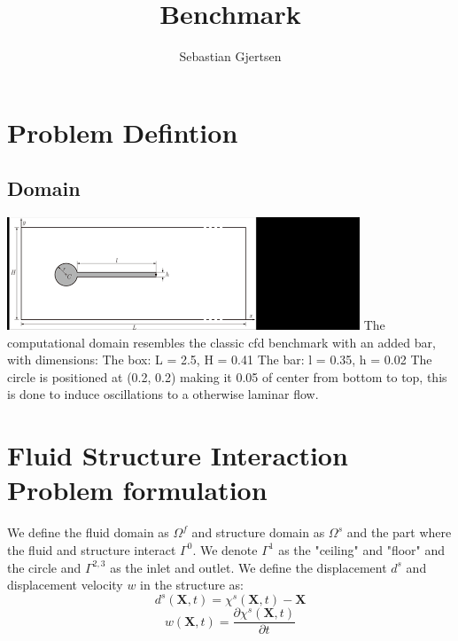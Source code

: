 
                                    
\title{Benchmark}
\author{Sebastian Gjertsen}

\maketitle
\section*{Problem Defintion}
\subsection*{Domain}
\includegraphics[scale=0.9]{geometry.png}
The computational domain resembles the classic cfd benchmark with an added bar, with dimensions:
The box: L = 2.5, H = 0.41
The bar: l = 0.35, h = 0.02
The circle is positioned at (0.2, 0.2) making it 0.05 of center from bottom to top, this is done to induce oscillations to a otherwise laminar flow.

\section*{Fluid Structure Interaction Problem formulation}
We define the fluid domain as $\Omega^f$ and structure domain as $\Omega^s$ and the part where the fluid and structure interact $\Gamma^0$. We denote $\Gamma^1$ as the "ceiling" and "floor" and the circle and $\Gamma^{2,3}$ as the inlet and outlet.
We define the displacement $d^s$ and displacement velocity $w$ in the structure as:
$$  d^s(\textbf{X},t) = \chi^s(\textbf{X},t) -\textbf{X}   $$
$$  w(\textbf{X},t) = \frac{\partial \chi^s(\textbf{X},t)}{\partial t}   $$

